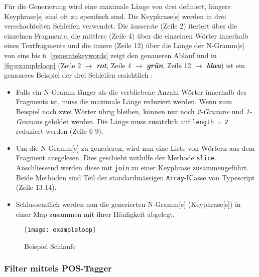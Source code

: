 Für die Generierung wird eine maximale Länge von drei definiert, längere \gls{Keyphrase}[s] sind oft zu spezifisch sind. Die \gls{Keyphrase}[s] werden in drei verschachtelten Schleifen verwendet. Die äusserste (Zeile 2) iteriert über die einzelnen Fragmente, die mittlere (Zeile 4) über die einzelnen Wörter innerhalb eines Textfragments und die innere (Zeile 12) über die Länge der \gls{N-Gramm}[e] von eins bis \texttt{n}.
\autoref{generatekeywords} zeigt den genaueren Ablauf und in \autoref{fig:exampleloop} (Zeile 2 $\rightarrow$ \textit{\textbf{rot}}, Zeile 4 $\rightarrow$ \textit{\textbf{grün}}, Zeile 12 $\rightarrow$ \textit{\textbf{blau}}) ist ein genaueres Beispiel der drei Schleifen ersichtlich :
\begin{itemize}
     \item Falls ein \gls{N-Gramm} länger als die verbliebene Anzahl Wörter innerhalb des Fragments ist, muss die maximale Länge reduziert werden. Wenn zum Beispiel noch zwei Wörter übrig bleiben, können nur noch \textit{2-Gramme} und \textit{1-Gramme} gebildet werden. Die Länge muss zusätzlich auf \texttt{length = 2} reduziert werden (Zeile 6-9).
     \item Um die \gls{N-Gramm}[e] zu generieren, wird nun eine Liste von Wört\-ern aus dem Fragment ausgelesen. Dies geschieht mithilfe der Methode \texttt{slice}. Anschliessend werden diese mit \texttt{join} zu einer \gls{Keyphrase} zusammengeführt. Beide Methoden sind Teil der standardmässigen \texttt{Array}-Klasse von Typescript (Zeile 13-14).
     \item Schlussendlich werden nun die generierten \gls{N-Gramm}[e] (\gls{Keyphrase}[s]) in einer Map zusammen mit ihrer Häufigkeit abgelegt.
\end{itemize}


\begin{figure}[H]
\centering
\texttt{[image: exampleloop]}
\caption{Beispiel Schlaufe}
\label{fig:exampleloop}
\end{figure}



\subsubsection{Filter mittels POS-Tagger}

